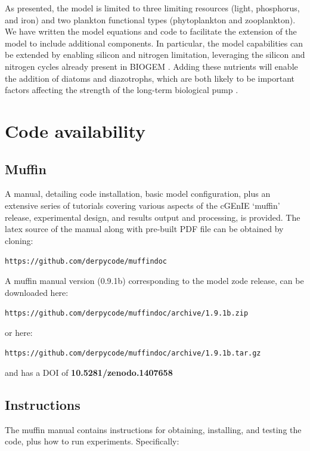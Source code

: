 \documentclass[gmd, manuscript]{copernicus}
\begin{document}
{As presented, the model is limited to three limiting resources (light, phosphorus, and iron) and two plankton functional types (phytoplankton and zooplankton). We have written the model equations and code to facilitate the extension of the model to include additional components. In particular, the model capabilities can be extended by enabling silicon and nitrogen limitation, leveraging the silicon and nitrogen cycles already present in BIOGEM \citep{Monteiro:2012}. Adding these nutrients will enable the addition of diatoms and diazotrophs, which are both likely to be important factors affecting the strength of the long-term biological pump \citep{Tyrrell:1999,Armstrong:2002}.


\section{Code availability} %

\subsection*{Muffin}
A manual, detailing code installation, basic model configuration, plus an extensive series of tutorials covering various aspects of the cGEnIE `muffin' release, experimental design, and results output and processing, is provided. The latex source of the manual along with pre-built PDF file can be obtained by cloning:

\texttt{https://github.com/derpycode/muffindoc}

\noindent A muffin manual version (0.9.1b) corresponding to the model zode release, can be downloaded here:

\texttt{https://github.com/derpycode/muffindoc/archive/1.9.1b.zip}

\noindent or here:

\texttt{https://github.com/derpycode/muffindoc/archive/1.9.1b.tar.gz}

\noindent and has a DOI of \textbf{10.5281/zenodo.1407658}

\subsection*{Instructions}

The muffin manual contains instructions for obtaining, installing, and testing the code, plus how to run experiments. Specifically:

}
\end{document}

